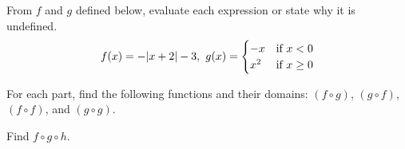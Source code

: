 \documentclass[11pt,addpoints]{exam}
\begin{document}
\begin{questions}
	\question From $f$ and $g$ defined below, evaluate each expression or state why it is undefined. %
	\[
		f(x) = -|x+2|-3,\hspace{0.125cm}
		g(x) = \begin{cases}
			-x  & \text{if } x < 0    \\
			x^2 & \text{if } x \geq 0
		\end{cases}
	\]
	\begin{multicols}{2}
	\end{multicols}

	\question For each part, find the following functions and their domains: $(f\circ g)$, $(g\circ f)$, $(f\circ f)$, and $(g\circ g)$.
	\begin{multicols}{2}
	\end{multicols}

	\question Find $f\circ g\circ h$.
\end{questions}
\end{document}
